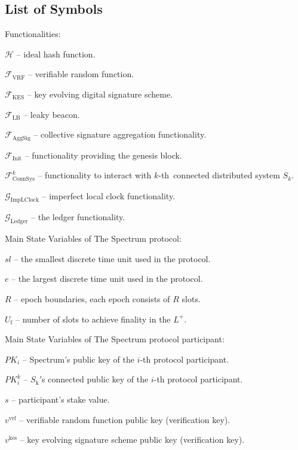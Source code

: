 \subsection{List of Symbols}\label{subsec:list-of-symbols}

Functionalities:
\begin{legal}
    \item[] $\mathcal{H}$ -- ideal hash function.
    \item[] $\mathcal{F}_{\text{VRF}}$ -- verifiable random function.
    \item[] $\mathcal{F}_{\text{KES}}$ -- key evolving digital signature scheme.
    \item[] $\mathcal{F}_{\text{LB}}$ -- leaky beacon.
    \item[] $\mathcal{F}_{\text{AggSig}}$ -- collective signature aggregation functionality.
    \item[] $\mathcal{F}_{\text{Init}}$ -- functionality providing the genesis block.
    \item[] $\mathcal{F}^k_{\text{ConnSys}}$ -- functionality to interact with $k$-th\
    connected distributed system $S_k$.
    \item[] $\mathcal{G}_{\text{ImpLClock}}$ -- imperfect local clock functionality.
    \item[] $\mathcal{G}_{\text{Ledger}}$ -- the ledger functionality.
\end{legal}
\bigbreak

\noindent
Main State Variables of The Spectrum protocol:
\begin{legal}
    \item[] $sl$ -- the smallest discrete time unit used in the protocol.
    \item[] $e$ -- the largest discrete time unit used in the protocol.
    \item[] $R$ -- epoch boundaries, each epoch consists of $R$ slots.
    \item[] $U_{\text{f}}$ -- number of slots to achieve finality in the $L^+$.
\end{legal}
\bigbreak

\noindent
Main State Variables of The Spectrum protocol participant:
\begin{legal}
    \item[] $PK_i$ -- Spectrum's public key of the $i$-th protocol participant.
    \item[] $PK^k_i$ --  $S_{\text{k}}$\('\)s connected public key of the $i$-th protocol participant.
    \item[] $s$ -- participant's stake value.
    \item[] $v^{\text{vrf}}$ -- verifiable random function public key (verification key).
    \item[] $v^{\text{kes}}$ -- key evolving signature scheme public key (verification key).
\end{legal}
\bigbreak

